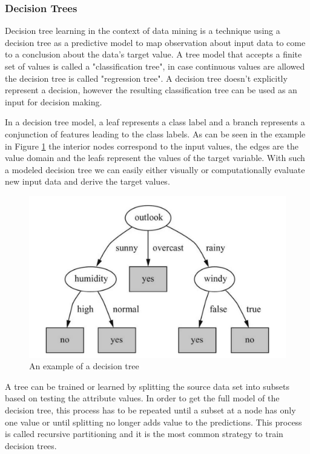 \subsubsection{Decision Trees}
Decision tree learning in the context of data mining is a technique using a decision tree as a predictive model to map observation about input data to come to a conclusion about the data's target value. A tree model that accepts a finite set of values is called a "classification tree", in case continuous values are allowed the decision tree is called "regression tree". A decision tree doesn't explicitly represent a decision, however the resulting classification tree can be used as an input for decision making. 

In a decision tree model, a leaf represents a class label and a branch represents a conjunction of features leading to the class labels. As can be seen in the example in Figure \ref{fig:image-decision-tree} the interior nodes correspond to the input values, the edges are the value domain and the leafs represent the values of the target variable. With such a modeled decision tree we can easily either visually or computationally evaluate new input data and derive the target values.

\begin{figure}[!ht]
	\centering
		\includegraphics[width=1.0\textwidth]{images/decision-tree}
	\caption{An example of a decision tree \cite{WikipediaDecisionTrees}}
	\label{fig:image-decision-tree}
\end{figure}

A tree can be trained or learned by splitting the source data set into subsets based on testing the attribute values. In order to get the full model of the decision tree, this process has to be repeated until a subset at a node has only one value or until splitting no longer adds value to the predictions. This process is called recursive partitioning and it is the most common strategy to train decision trees.

